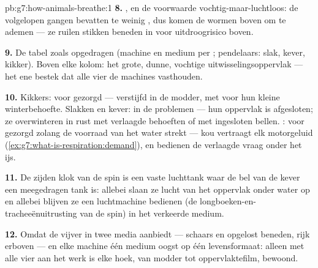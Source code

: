 \begin{solution}{pb:g7:how-animals-breathe:1}
\textbf{8.} , en de voorwaarde vochtig-maar-luchtloos: de
volgelopen gangen bevatten te weinig , dus komen de wormen boven
om te ademen --- ze ruilen stikken beneden in voor uitdroogrisico boven.

\textbf{9.} De tabel zoals opgedragen (machine en medium per ;
pendelaars: slak, kever, kikker). Boven elke kolom: het grote, dunne,
vochtige uitwisselingsoppervlak --- het ene bestek dat alle vier de
machines vasthouden.

\textbf{10.} Kikkers: voor gezorgd --- verstijfd in de modder, met
 voor hun kleine winterbehoefte. Slakken en kever: in de
problemen --- hun oppervlak is afgesloten; ze overwinteren in rust met
verlaagde behoeften of met ingesloten bellen. : voor gezorgd zolang
de voorraad van het water strekt --- kou vertraagt elk motorgeluid
(\cref{ex:g7:what-is-respiration:demand}), en  bedienen de
verlaagde vraag onder het ijs.

\textbf{11.} De zijden klok van de spin is een vaste luchttank waar de
bel van de kever een meegedragen tank is: allebei slaan ze lucht van het
oppervlak onder water op en allebei blijven ze een luchtmachine bedienen
(de longboeken-en-tracheeënuitrusting van de spin) in het verkeerde
medium.

\textbf{12.} Omdat de vijver  in twee media aanbiedt --- schaars
en opgelost beneden, rijk erboven --- en elke machine één medium oogst op
één levensformaat: alleen met alle vier aan het werk is elke hoek, van
modder tot oppervlaktefilm, bewoond.
\end{solution}
